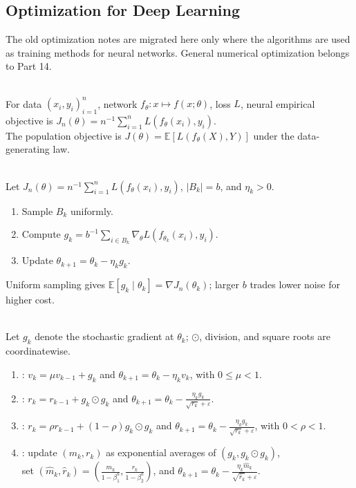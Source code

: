 \subsection{Optimization for Deep Learning}

The old optimization notes are migrated here only where the algorithms are used as training methods for neural networks.  General numerical optimization belongs to Part 14.

\begin{definition} \label{def:sl-neural-empirical-objective} \\
For data $(x_i,y_i)_{i=1}^n$, network $f_\theta:x\mapsto f(x;\theta)$, loss $L$, neural empirical objective is $J_n(\theta)=n^{-1}\sum\limits_{i=1}^nL(f_\theta(x_i),y_i)$.\\
The population objective is $J(\theta)=\mathbb E[L(f_\theta(X),Y)]$ under the data-generating law.
\end{definition}

\begin{method} \label{method:sl-sgd-minibatch} \\
Let $J_n(\theta)=n^{-1}\sum\limits_{i=1}^nL(f_\theta(x_i),y_i)$, $|B_k|=b$, and $\eta_k>0$.
\begin{enumerate}[label=(\roman*)]
\setlength{\itemsep}{0pt}
\item Sample $B_k$ uniformly.
\item Compute $g_k=b^{-1}\sum_{i\in B_k}\nabla_{\theta}L(f_{\theta_k}(x_i),y_i)$.
\item Update $\theta_{k+1}=\theta_k-\eta_kg_k$.
\end{enumerate}
Uniform sampling gives $\mathbb E[g_k\mid\theta_k]=\nabla J_n(\theta_k)$; larger $b$ trades lower noise for higher cost.
\end{method}

\begin{definition} \label{def:sl-momentum-adaptive-methods} \\
Let $g_k$ denote the stochastic gradient at $\theta_k$; $\odot$, division, and square roots are coordinatewise.
\begin{enumerate}[label=(\roman*)]
\setlength{\itemsep}{0pt}
\item {}: $v_k=\mu v_{k-1}+g_k$ and $\theta_{k+1}=\theta_k-\eta_kv_k$, with $0\leq\mu<1$.
\item {}: $r_k=r_{k-1}+g_k\odot g_k$ and $\theta_{k+1}=\theta_k-\frac{\eta_kg_k}{\sqrt{r_k}+\varepsilon}$.
\item {}: $r_k=\rho r_{k-1}+(1-\rho)g_k\odot g_k$ and $\theta_{k+1}=\theta_k-\frac{\eta_kg_k}{\sqrt{r_k}+\varepsilon}$, with $0<\rho<1$.
\item {}: update $(m_k,r_k)$ as exponential averages of $(g_k,g_k\odot g_k)$,\\
set $(\widehat m_k,\widehat r_k)=(\frac{m_k}{1-\beta_1^k},\frac{r_k}{1-\beta_2^k})$, and $\theta_{k+1}=\theta_k-\frac{\eta_k\widehat m_k}{\sqrt{\widehat r_k}+\varepsilon}$.
\end{enumerate}
\end{definition}

